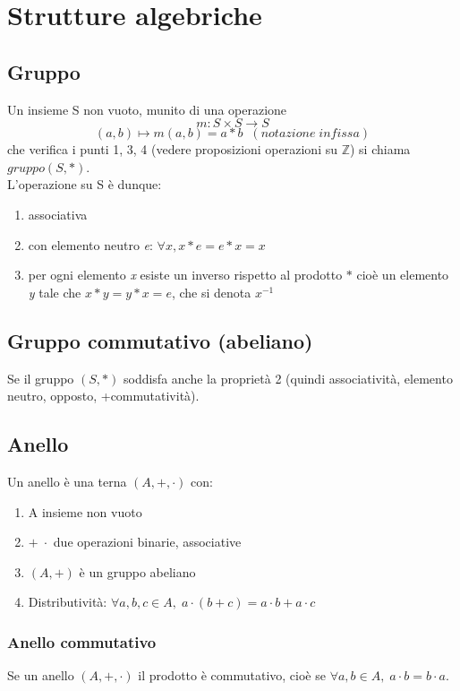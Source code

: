 \section{Strutture algebriche}

\subsection{Gruppo} 
Un insieme S non vuoto, munito di una operazione \[m:S\times S\rightarrow S\]
\[(a,b)\mapsto m(a,b)=a\ast b\;\; (notazione\; infissa)\]
che verifica i punti 1, 3, 4 (vedere proposizioni operazioni su $\mathbb{Z}$) si chiama \(gruppo(S,\ast)\).
\\L'operazione su S è dunque:
\begin{enumerate}
    \item associativa
    \item con elemento neutro \textit{e}: \(\forall x, x\ast e=e\ast x=x\)
    \item per ogni elemento \textit{x} esiste un inverso rispetto al prodotto \(\ast\) cioè un elemento \textit{y} tale che \(x\ast y=y\ast x=e\), che si denota \(x^{-1}\)
\end{enumerate}

\subsection{Gruppo commutativo (abeliano)} 
Se il gruppo \((S, \ast)\) soddisfa anche la proprietà 2 (quindi associatività,  elemento neutro, opposto, +commutatività).

\subsection{Anello} 
Un anello è una terna \((A,+,\cdot)\) con:
\begin{enumerate}
    \item A insieme non vuoto
    \item \(+ \; \cdot\) due operazioni binarie, associative
    \item \((A,+)\) è un gruppo abeliano
    \item Distributività: \(\forall a, b, c \in A, \; a\cdot (b+c)=a\cdot b+a\cdot c\)
\end{enumerate}

\subsubsection{Anello commutativo} 
Se un anello \((A,+,\cdot)\) il prodotto è commutativo, cioè se \(\forall a,b\in A,\;a\cdot b=b\cdot a\).

